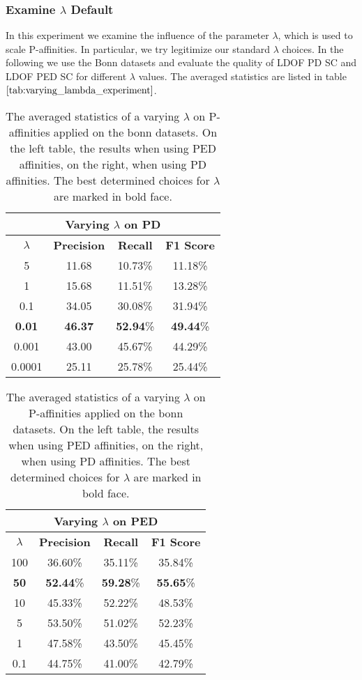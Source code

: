\subsubsection{Examine $\lambda$ Default}
In this experiment we examine the influence of the parameter $\lambda$, which is used to scale P-affinities. In particular, we try legitimize our standard $\lambda$ choices. In the following we use the Bonn datasets and evaluate the quality of LDOF PD SC and LDOF PED SC for different $\lambda$ values. The averaged statistics are listed in table $\ref{tab:varying_lambda_experiment}$.
\begin{table}[H]
\centering
\setlength\tabcolsep{4pt}
\begin{minipage}{0.48\textwidth}
\centering
\begin{tabular}{|c|c|c|c|}
\hline
\multicolumn{4}{|c|}{Varying $\lambda$ on PD} \\ \hline
$\lambda$ & \textbf{Precision} & \textbf{Recall} & \textbf{F1 Score} \\ \hline
5 & 11.68 & 10.73\% & 11.18\%  \\ \hline
1 & 15.68 & 11.51\% & 13.28\%  \\ \hline
0.1 & 34.05 & 30.08\% & 31.94\%  \\ \hline
\textbf{0.01} & \textbf{46.37} & \textbf{52.94}\% & \textbf{49.44}\%  \\ \hline
0.001 & 43.00 & 45.67\% & 44.29\%  \\ \hline
0.0001 & 25.11 & 25.78\% & 25.44\%  \\ \hline
\end{tabular}
\end{minipage}%
\hfill
\begin{minipage}{0.48\textwidth}
\centering
\begin{tabular}{|c|c|c|c|}
\hline
\multicolumn{4}{|c|}{Varying $\lambda$ on PED}                        \\ \hline
$\lambda$ & \textbf{Precision} & \textbf{Recall} & \textbf{F1 Score} \\ \hline
100 & 36.60\% & 35.11\% & 35.84\%  \\ \hline
\textbf{50} & \textbf{52.44}\% & \textbf{59.28}\% & \textbf{55.65}\%  \\ \hline
10 & 45.33\% & 52.22\% & 48.53\%  \\ \hline
5 & 53.50\% & 51.02\% & 52.23\%  \\ \hline
1 & 47.58\% & 43.50\% & 45.45\%  \\ \hline
0.1 & 44.75\% & 41.00\% & 42.79\%  \\ \hline
\end{tabular}
\end{minipage}
\caption[Experiment Varying $\lambda$]{The averaged statistics of a varying $\lambda$ on P-affinities applied on the bonn datasets. On the left table, the results when using PED affinities, on the right, when using PD affinities. The best determined choices for $\lambda$ are marked in bold face.}
\label{tab:varying_lambda_experiment}
\end{table}
